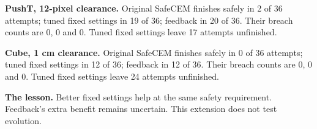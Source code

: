 \textbf{PushT, 12-pixel clearance.} Original SafeCEM finishes safely
in 2 of 36 attempts; tuned fixed settings in 19 of 36;
feedback in 20 of 36. Their breach counts are 0,
0 and 0. Tuned fixed settings leave 17 attempts unfinished.

\textbf{Cube, 1 cm clearance.} Original SafeCEM finishes safely
in 0 of 36 attempts; tuned fixed settings in 12 of 36;
feedback in 12 of 36. Their breach counts are 0,
0 and 0. Tuned fixed settings leave 24 attempts unfinished.

\textbf{The lesson.} Better fixed settings help at the same safety requirement.
Feedback's extra benefit remains uncertain. This extension does not test evolution.
